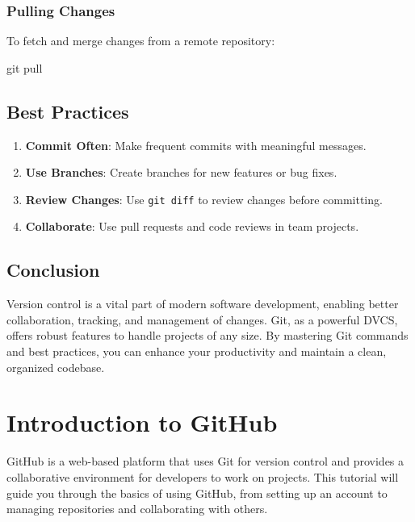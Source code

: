 \documentclass[
  letterpaper,
  DIV=11,
  numbers=noendperiod]{scrreprt}
\newenvironment{Shaded}{\begin{snugshade}}{\end{snugshade}}
\newcommand{\FunctionTok}[1]{\textcolor[rgb]{0.28,0.35,0.67}{#1}}
\newcommand{\NormalTok}[1]{\textcolor[rgb]{0.00,0.23,0.31}{#1}}
\providecommand{\tightlist}{%
  \setlength{\itemsep}{0pt}\setlength{\parskip}{0pt}}\usepackage{longtable,booktabs,array}
\begin{document}
\subsubsection{Pulling Changes}\label{pulling-changes}

To fetch and merge changes from a remote repository:

\begin{Shaded}
\begin{Highlighting}[]
\FunctionTok{git}\NormalTok{ pull}
\end{Highlighting}
\end{Shaded}

\subsection{Best Practices}\label{best-practices-5}

\begin{enumerate}
\def\labelenumi{\arabic{enumi}.}
\tightlist
\item
  \textbf{Commit Often}: Make frequent commits with meaningful messages.
\item
  \textbf{Use Branches}: Create branches for new features or bug fixes.
\item
  \textbf{Review Changes}: Use \texttt{git\ diff} to review changes
  before committing.
\item
  \textbf{Collaborate}: Use pull requests and code reviews in team
  projects.
\end{enumerate}

\subsection{Conclusion}\label{conclusion-44}

Version control is a vital part of modern software development, enabling
better collaboration, tracking, and management of changes. Git, as a
powerful DVCS, offers robust features to handle projects of any size. By
mastering Git commands and best practices, you can enhance your
productivity and maintain a clean, organized codebase.

\section{Introduction to GitHub}\label{introduction-to-github}

GitHub is a web-based platform that uses Git for version control and
provides a collaborative environment for developers to work on projects.
This tutorial will guide you through the basics of using GitHub, from
setting up an account to managing repositories and collaborating with
others.
\end{document}
